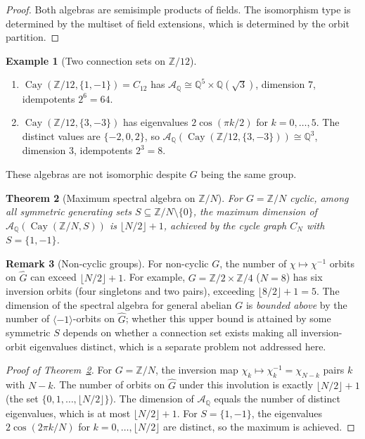 \documentclass[12pt]{amsart}
\numberwithin{equation}{section}
\theoremstyle{plain}
\newtheorem{theorem}{Theorem}[section]
\theoremstyle{definition}
\newtheorem{example}[theorem]{Example}
\newtheorem{remark}[theorem]{Remark}
\DeclareMathOperator{\Cay}{Cay}
\newcommand{\Z}{\mathbb{Z}}
\newcommand{\Q}{\mathbb{Q}}
\newcommand{\calA}{\mathcal{A}}
\newcommand{\Ghat}{\widehat{G}}
\begin{document}
\begin{proof}
Both algebras are semisimple products of fields.  The isomorphism type
is determined by the multiset of field extensions, which is determined
by the orbit partition.
\end{proof}

\begin{example}[Two connection sets on $\Z/12$]
\mbox{}
\begin{enumerate}[label=\textup{(\roman*)}]
  \item $\Cay(\Z/12, \{1,-1\}) = C_{12}$ has
    $\calA_\Q \cong \Q^5 \times \Q(\sqrt{3})$, dimension $7$, idempotents
    $2^6 = 64$.
  \item $\Cay(\Z/12, \{3,-3\})$ has eigenvalues
    $2\cos(\pi k/2)$ for $k = 0, \ldots, 5$.
    The distinct values are $\{-2, 0, 2\}$, so
    $\calA_\Q(\Cay(\Z/12, \{3,-3\})) \cong \Q^3$,
    dimension $3$, idempotents $2^3 = 8$.
\end{enumerate}
These algebras are not isomorphic despite $G$ being the same group.
\end{example}

\begin{theorem}[Maximum spectral algebra on $\Z/N$]
\label{thm:max}
For $G = \Z/N$ cyclic, among all symmetric generating sets
$S \subseteq \Z/N \setminus \{0\}$, the maximum dimension of
$\calA_\Q(\Cay(\Z/N, S))$ is $\lfloor N/2 \rfloor + 1$, achieved by the
cycle graph $C_N$ with $S = \{1,-1\}$.
\end{theorem}

\begin{remark}[Non-cyclic groups]
For non-cyclic $G$, the number of $\chi \mapsto \chi^{-1}$ orbits on
$\Ghat$ can exceed $\lfloor N/2 \rfloor + 1$.  For example,
$G = \Z/2 \times \Z/4$ ($N = 8$) has six inversion orbits (four singletons
and two pairs), exceeding $\lfloor 8/2 \rfloor + 1 = 5$.  The dimension
of the spectral algebra for general abelian $G$ is \emph{bounded above}
by the number of $\langle -1 \rangle$-orbits on $\Ghat$; whether this
upper bound is attained by some symmetric $S$ depends on whether a
connection set exists making all inversion-orbit eigenvalues distinct,
which is a separate problem not addressed here.
\end{remark}

\begin{proof}[Proof of Theorem~\ref{thm:max}]
For $G = \Z/N$, the inversion map $\chi_k \mapsto \chi_k^{-1} = \chi_{N-k}$
pairs $k$ with $N-k$.  The number of orbits on $\Ghat$ under this
involution is exactly $\lfloor N/2 \rfloor + 1$ (the set $\{0, 1, \ldots,
\lfloor N/2 \rfloor\}$).  The dimension of $\calA_\Q$ equals the number of
distinct eigenvalues, which is at most $\lfloor N/2 \rfloor + 1$.  For
$S = \{1,-1\}$, the eigenvalues $2\cos(2\pi k/N)$ for $k = 0, \ldots,
\lfloor N/2 \rfloor$ are distinct, so the maximum is achieved.
\end{proof}
\end{document}
